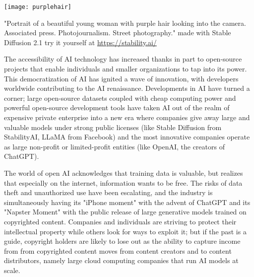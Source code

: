 \begin{pdf}
\begin{marginfigure}[-5.5cm]
    \texttt{[image: purplehair]}
        \caption{"Portrait of a beautiful young woman with purple hair looking into the camera. Associated press. Photojournalism. Street photography." made with Stable Diffusion 2.1 try it yourself at \url{https://stability.ai/}}
\end{marginfigure}
\end{pdf}
The accessibility of AI technology has increased thanks in part to open-source projects that enable individuals and smaller organizations to tap into its power. This democratization of AI has ignited a wave of innovation, with developers worldwide contributing to the AI renaissance. Developments in AI have turned a corner; large open-source datasets coupled with cheap computing power and powerful open-source development tools have taken AI out of the realm of expensive private enterprise into a new era where companies give away large and valuable models under strong public licenses (like Stable Diffusion from StabilityAI, LLaMA from Facebook) and the most innovative companies operate as large non-profit or limited-profit entities (like OpenAI, the creators of ChatGPT).

The world of open AI acknowledges that training data is valuable, but realizes that especially on the internet, information wants to be free. The risks of data theft and unauthorized use have been escalating, and the industry is simultaneously having its "iPhone moment" with the advent of ChatGPT and its "Napster Moment" with the public release of large generative models trained on copyrighted content. Companies and individuals are striving to protect their intellectual property while others look for ways to exploit it; but if the past is a guide, copyright holders are likely to lose out as the ability to capture income from from copyrighted content moves from content creators and to content distributors, namely large cloud computing companies that run AI models at scale.


